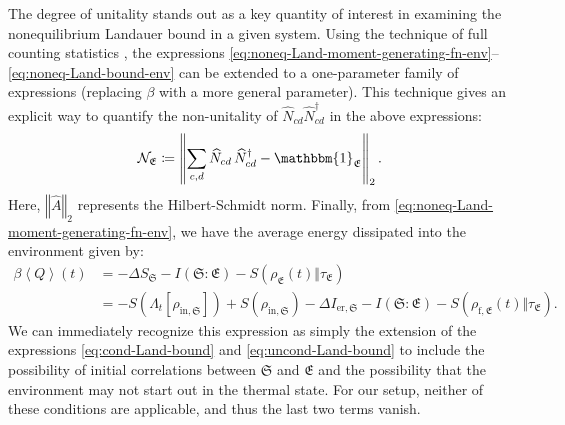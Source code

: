 \documentclass[preprints,article,accept,moreauthors,pdftex]{Definitions/mdpi}
\begin{document}
\begin{paracol}{2}
The degree of unitality stands out as a key quantity of interest in examining the nonequilibrium Landauer bound in a given system. Using the technique of full counting statistics \cite{EHM09}, the expressions \eqref{eq:noneq-Land-moment-generating-fn-env}--\eqref{eq:noneq-Land-bound-env} can be extended \cite{GCGPVP17} to a one-parameter family of expressions (replacing $\beta$ with a more general parameter). This technique gives an explicit way to quantify the non-unitality of $\widehat{N}_{cd}\widehat{N}_{cd}^{\dagger}$ in the above expressions:
\begin{equation}
    \label{eq:nonunitality}
    \mathcal{N}_{\mathfrak{E}} \coloneqq \left\Vert\sum_{c,d} \widehat{N}_{cd}\,\widehat{N}_{cd}^{\dagger}-\mathbbm{1}_{\mathfrak{E}}\right\Vert_{2}.
\end{equation}
Here, $\left\Vert\widehat{A}\right\Vert_{2}$ represents the Hilbert-Schmidt norm. Finally, from \eqref{eq:noneq-Land-moment-generating-fn-env}, we have the average energy dissipated into the environment given \cite{Goold15,GCGPVP17,EHM09,Reeb14,TD21} by:
\begin{equation}
    \label{eq:noneq-Land-env-heat-inc}
    \begin{split}
        \beta\left\langle Q\right\rangle\left(t\right) &= -\Delta S_{\mathfrak{S}} - I(\mathfrak{S}:\mathfrak{E}) - S\left(\rho_{\mathfrak{E}}\left(t\right)\Vert\tau_{\mathfrak{E}}\right) \\[4pt]
        & = - S\left(\Lambda_{t}\left[\rho_{\mathrm{in},\mathfrak{S}}\right]\right) + S\left(\rho_{\mathrm{in},\mathfrak{S}}\right) - \Delta I_{\mathrm{er},\mathfrak{S}} - I(\mathfrak{S}:\mathfrak{E}) - S\left(\rho_{\mathrm{f},\mathfrak{E}}\left(t\right)\Big\Vert\tau_{\mathfrak{E}}\right).
    \end{split}
\end{equation}
We can immediately recognize this expression as simply the extension of the expressions \eqref{eq:cond-Land-bound} and \eqref{eq:uncond-Land-bound} to include the possibility of initial correlations between $\mathfrak{S}$ and $\mathfrak{E}$ and the possibility that the environment may not start out in the thermal state. For our setup, neither of these conditions are applicable, and thus the last two terms vanish.


\end{paracol}
\end{document}
